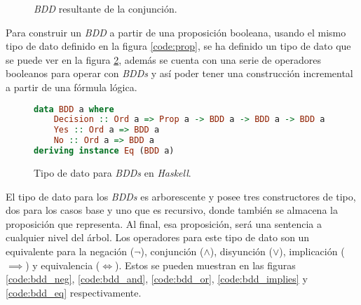\begin{figure}
    \centering
\caption{\textit{BDD} resultante de la conjunción.}
\label{fig:bdd_r}
\end{figure}

Para construir un \textit{BDD} a partir de una proposición booleana, usando el mismo tipo de dato definido en la figura \ref{code:prop}, se ha definido un tipo de dato que se puede ver en la figura \ref{code:bdds}, además se cuenta con una serie de operadores booleanos para operar con \textit{BDDs} y así poder tener una construcción incremental a partir de una fórmula lógica.

\begin{figure}
\begin{lstlisting}[language=Haskell]
data BDD a where
    Decision :: Ord a => Prop a -> BDD a -> BDD a -> BDD a
    Yes :: Ord a => BDD a
    No :: Ord a => BDD a
deriving instance Eq (BDD a)
\end{lstlisting}
\caption{Tipo de dato para \textit{BDDs} en \textit{Haskell}.}
\label{code:bdds}
\end{figure}

El tipo de dato para los \textit{BDDs} es arborescente y posee tres constructores de tipo, dos para los casos base y uno que es recursivo, donde también se almacena la proposición que representa. Al final, esa proposición, será una sentencia a cualquier nivel del árbol. Los operadores para este tipo de dato son un equivalente para la negación ($\neg$), conjunción ($\land$), disyunción ($\lor$), implicación ($\implies$) y equivalencia ($\iff$). Estos se pueden muestran en las figuras \ref{code:bdd_neg}, \ref{code:bdd_and}, \ref{code:bdd_or}, \ref{code:bdd_implies} y \ref{code:bdd_eq} respectivamente.

